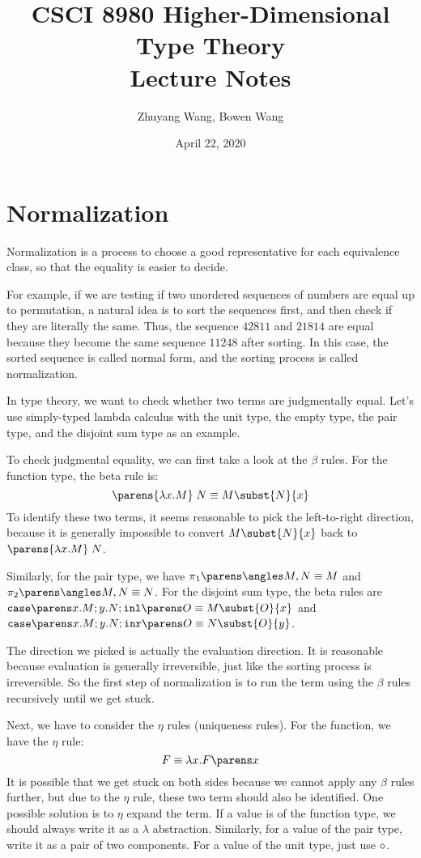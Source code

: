 \documentclass[11pt]{article}
\title{CSCI 8980 Higher-Dimensional Type Theory\\ Lecture Notes}
\author{Zhuyang Wang, Bowen Wang}
\date{April 22, 2020}
\begin{document}
\maketitle

\section{Normalization}
Normalization is a process to choose a good representative for each equivalence class, so that the equality is easier to decide.

For example, if we are testing if two unordered sequences of numbers are equal up to permutation, a natural idea is to sort the sequences first, and then check if they are literally the same. Thus, the sequence $42811$ and $21814$ are equal because they become the same sequence $11248$ after sorting. In this case, the sorted sequence is called normal form, and the sorting process is called normalization.

In type theory, we want to check whether two terms are judgmentally equal. Let's use simply-typed lambda calculus with the unit type, the empty type, the pair type, and the disjoint sum type as an example.

To check judgmental equality, we can first take a look at the $\beta$ rules. For the function type, the beta rule is:
\[
  \app{\parens{\lam{x}{M}}}{N} \equiv M\subst{N}{x}
\]
To identify these two terms, it seems reasonable to pick the left-to-right direction, because it is generally impossible to convert $M\subst{N}{x}$ back to $\app{\parens{\lam{x}{M}}}{N}$.

Similarly, for the pair type, we have $\pairfst{\pair{M}{N}} \equiv M$ and $\pairsnd{\pair{M}{N}} \equiv N$. For the disjoint sum type, the beta rules are $\sumcase{x}{M}{y}{N}{\suminl{O}} \equiv M\subst{O}{x}$ and $\sumcase{x}{M}{y}{N}{\suminr{O}} \equiv N\subst{O}{y}$.

The direction we picked is actually the evaluation direction. It is reasonable because evaluation is generally irreversible, just like the sorting process is irreversible. So the first step of normalization is to run the term using the $\beta$ rules recursively until we get stuck.

Next, we have to consider the $\eta$ rules (uniqueness rules). For the function, we have the $\eta$ rule:
\[
  F \equiv \lam{x}{\app*{F}{x}}
\]
It is possible that we get stuck on both sides because we cannot apply any $\beta$ rules further, but due to the $\eta$ rule, these two term should also be identified. One possible solution is to $\eta$ expand the term. If a value is of the function type, we should always write it as a $\lambda$ abstraction. Similarly, for a value of the pair type, write it as a pair of two components. For a value of the unit type, just use $\diamond$.
\end{document}
